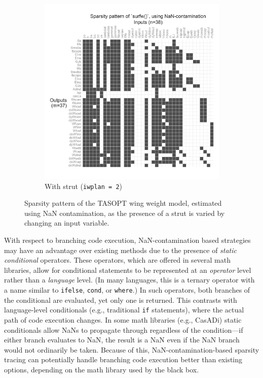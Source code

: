 \begin{figure}[H]
\begin{subfigure}{0.49\textwidth}
        \includegraphics[width=\textwidth]{../figures/nan-propagation/image5.png}
        \caption{With strut (\texttt{iwplan = 2})}
    \end{subfigure}
    \caption{Sparsity pattern of the TASOPT wing weight model, estimated using NaN contamination, as the presence of a strut is varied by changing an input variable.}
    \label{fig:nan-jacobian-branching}
\end{figure}

With respect to branching code execution, NaN-contamination based strategies may have an advantage over existing methods due to the presence of \emph{static conditional} operators. These operators, which are offered in several math libraries, allow for conditional statements to be represented at an \emph{operator} level rather than a \emph{language} level. (In many languages, this is a ternary operator with a name similar to \texttt{ifelse}, \texttt{cond}, or \texttt{where}.) In such operators, both branches of the conditional are evaluated, yet only one is returned. This contrasts with language-level conditionals (e.g., traditional \texttt{if} statements), where the actual path of code execution changes. In some math libraries (e.g., CasADi) static conditionals allow NaNs to propagate through regardless of the condition—if either branch evaluates to NaN, the result is a NaN even if the NaN branch would not ordinarily be taken. Because of this, NaN-contamination-based sparsity tracing can potentially handle branching code execution better than existing options, depending on the math library used by the black box.

